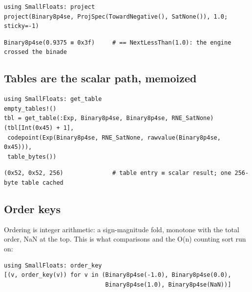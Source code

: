\begin{verbatim}
using SmallFloats: project
project(Binary8p4se, ProjSpec(TowardNegative(), SatNone()), 1.0; sticky=-1)
\end{verbatim}




\begin{verbatim}
Binary8p4se(0.9375 ≡ 0x3f)     # == NextLessThan(1.0): the engine crossed the binade
\end{verbatim}



\subsection{Tables are the scalar path, memoized}



\label{17860062526638989794}{}



\begin{verbatim}
using SmallFloats: get_table
empty_tables!()
tbl = get_table(:Exp, Binary8p4se, Binary8p4se, RNE_SatNone)
(tbl[Int(0x45) + 1],
 codepoint(Exp(Binary8p4se, RNE_SatNone, rawvalue(Binary8p4se, 0x45))),
 table_bytes())
\end{verbatim}




\begin{verbatim}
(0x52, 0x52, 256)              # table entry ≡ scalar result; one 256-byte table cached
\end{verbatim}



\subsection{Order keys}



\label{11135872524320346846}{}


Ordering is integer arithmetic: a sign-magnitude fold, monotone with the total order, NaN at the top. This is what comparisons and the O(n) counting sort run on:




\begin{verbatim}
using SmallFloats: order_key
[(v, order_key(v)) for v in (Binary8p4se(-1.0), Binary8p4se(0.0),
                             Binary8p4se(1.0), Binary8p4se(NaN))]
\end{verbatim}




